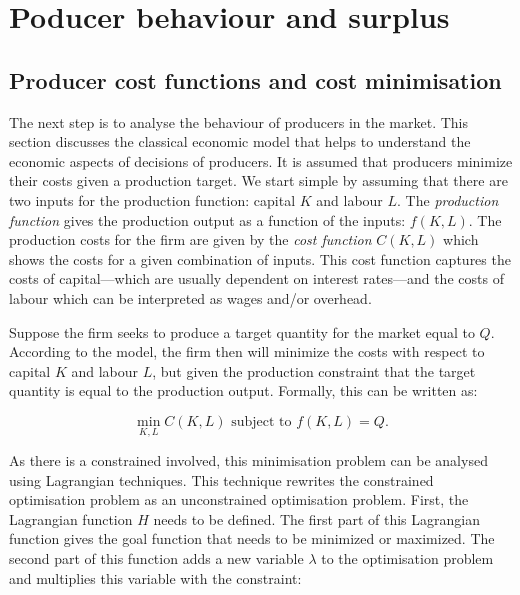 \documentclass[
]{book}
\begin{document}
\hypertarget{sec:procbeh}{%
\section{Poducer behaviour and surplus}\label{sec:procbeh}}

\hypertarget{producer-cost-functions-and-cost-minimisation}{%
\subsection{Producer cost functions and cost minimisation}\label{producer-cost-functions-and-cost-minimisation}}

The next step is to analyse the behaviour of producers in the market. This section discusses the classical economic model that helps to understand the economic aspects of decisions of producers. It is assumed that producers minimize their costs given a production target. We start simple by assuming that there are two inputs for the production function: capital \(K\) and labour \(L\). The \emph{production function} gives the production output as a function of the inputs: \(f(K,L)\). The production costs for the firm are given by the \emph{cost function} \(C(K,L)\) which shows the costs for a given combination of inputs. This cost function captures the costs of capital---which are usually dependent on interest rates---and the costs of labour which can be interpreted as wages and/or overhead.

Suppose the firm seeks to produce a target quantity for the market equal to \(Q\). According to the model, the firm then will minimize the costs with respect to capital \(K\) and labour \(L\), but given the production constraint that the target quantity is equal to the production output. Formally, this can be written as:

\begin{equation}
\displaystyle{\min_{K,L}  C(K,L)} \text{ subject to }f(K,L) = Q.
\end{equation}

As there is a constrained involved, this minimisation problem can be analysed using Lagrangian techniques. This technique rewrites the constrained optimisation problem as an unconstrained optimisation problem. First, the Lagrangian function \(H\) needs to be defined. The first part of this Lagrangian function gives the goal function that needs to be minimized or maximized. The second part of this function adds a new variable \(\lambda\) to the optimisation problem and multiplies this variable with the constraint:
\end{document}
